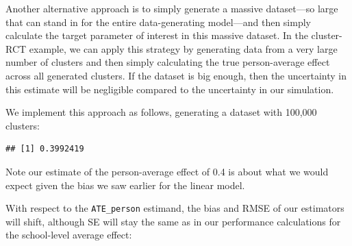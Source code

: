 \documentclass[
]{book}
\newenvironment{Shaded}{\begin{snugshade}}{\end{snugshade}}
\newcommand{\AttributeTok}[1]{\textcolor[rgb]{0.13,0.29,0.53}{#1}}
\newcommand{\DecValTok}[1]{\textcolor[rgb]{0.00,0.00,0.81}{#1}}
\newcommand{\FloatTok}[1]{\textcolor[rgb]{0.00,0.00,0.81}{#1}}
\newcommand{\FunctionTok}[1]{\textcolor[rgb]{0.13,0.29,0.53}{\textbf{#1}}}
\newcommand{\NormalTok}[1]{#1}
\newcommand{\OtherTok}[1]{\textcolor[rgb]{0.56,0.35,0.01}{#1}}
\newcommand{\SpecialCharTok}[1]{\textcolor[rgb]{0.81,0.36,0.00}{\textbf{#1}}}
\begin{document}
Another alternative approach is to simply generate a massive dataset---so large that can stand in for the entire data-generating model---and then simply calculate the target parameter of interest in this massive dataset. In the cluster-RCT example, we can apply this strategy by generating data from a very large number of clusters and then simply calculating the true person-average effect across all generated clusters.
If the dataset is big enough, then the uncertainty in this estimate will be negligible compared to the uncertainty in our simulation.

We implement this approach as follows, generating a dataset with 100,000 clusters:

\begin{Shaded}
\end{Shaded}

\begin{verbatim}
## [1] 0.3992419
\end{verbatim}

Note our estimate of the person-average effect of 0.4 is about what we would expect given the bias we saw earlier for the linear model.

With respect to the \texttt{ATE\_person} estimand, the bias and RMSE of our estimators will shift, although SE will stay the same as in our performance calculations for the school-level average effect:
\end{document}
